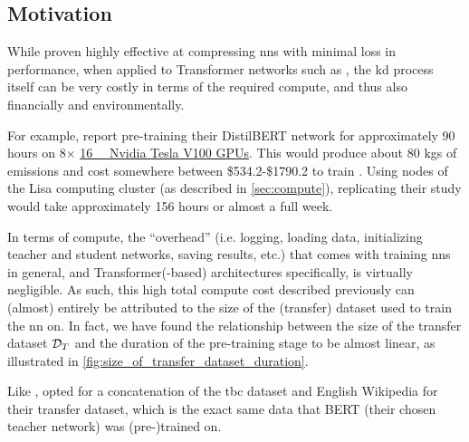 \subsection{Motivation}
\label{subsec:size_of_transfer_dataset_motivation}
While proven highly effective at compressing \glspl{nn} with minimal loss in performance, when applied to Transformer networks such as \bertbase, the \gls{kd} process itself can be very costly in terms of the required compute, and thus also financially and environmentally. 

For example, \citet{sanh2019distilbert} report pre-training their DistilBERT network for approximately 90 hours on 8$\times$ \href{https://www.nvidia.com/en-gb/data-center/tesla-v100/}{\SI{16}{\giga\byte} Nvidia Tesla V100 GPUs}. This would produce about 80 kgs of \carbon emissions and cost somewhere between \$534.2-\$1790.2 to train \citep{lacoste2019quantifying,strubell2019energy}. Using nodes of the  Lisa computing cluster (as described in \cref{sec:compute}), replicating their study would take approximately 156 hours or almost a full week.

In terms of compute, the ``overhead'' (i.e. logging, loading data, initializing teacher and student networks, saving results, etc.) that comes with training \glspl{nn} in general, and Transformer(-based) architectures specifically, is virtually negligible. As such, this high total compute cost described previously can (almost) entirely be attributed to the size of the (transfer) dataset used to train the \gls{nn} on. In fact, we have found the relationship between the size of the transfer dataset $\mathcal{D}_T$ and the duration of the pre-training stage to be almost linear, as illustrated in \cref{fig:size_of_transfer_dataset_duration}.

Like \citet{turc2019well,sun2020mobilebert}, \citet{sanh2019distilbert} opted for a concatenation of the \gls{tbc} dataset and English Wikipedia for their transfer dataset, which is the exact same data that BERT \citep{devlin2018bert} (their chosen teacher network) was (pre-)trained on.

